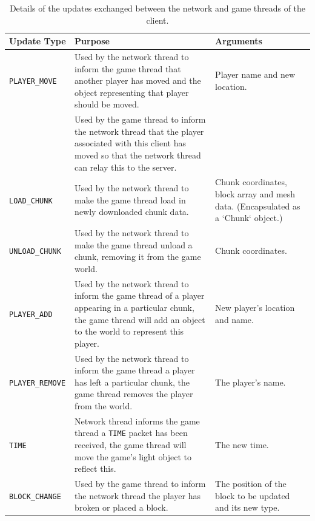 \documentclass[10pt,twoside,notitlepage,a4paper]{report}
\begin{document}
	\begin{table}
		\begin{tabularx}{\textwidth}{| l | X | p{3cm} |}
			\hline
			\bf Update Type & Purpose & Arguments \\
			\hline
			\tt PLAYER\_MOVE & Used by the network thread to inform the game thread that another player has moved and the object representing that player should be moved. & Player name and new location.\\
			\cline{2-2}
			\tt & Used by the game thread to inform the network thread that the player associated with this client has moved so that the network thread can relay this to the server. & \\
			\hline
			\tt LOAD\_CHUNK & Used by the network thread to make the game thread load in newly downloaded chunk data. & Chunk coordinates, block array and mesh data. (Encapsulated as a `Chunk` object.) \\
			\hline
			\tt UNLOAD\_CHUNK & Used by the network thread to make the game thread unload a chunk, removing it from the game world. & Chunk coordinates. \\
			\hline
			\tt PLAYER\_ADD & Used by the network thread to inform the game thread of a player appearing in a particular chunk, the game thread will add an object to the world to represent this player. & New player's location and name. \\
			\hline
			\tt PLAYER\_REMOVE & Used by the network thread to inform the game thread a player has left a particular chunk, the game thread removes the player from the world. & The player's name. \\
			\hline
			\tt TIME & Network thread informs the game thread a \texttt{TIME} packet has been received, the game thread will move the game's light object to reflect this. & The new time. \\
			\hline
			\tt BLOCK\_CHANGE & Used by the game thread to inform the network thread the player has broken or placed a block. & The position of the block to be updated and its new type.\\
			\hline
		\end{tabularx}
		\caption{Details of the updates exchanged between the network and game threads of the client.}
		\label{tab:updates}
	\end{table}
	
\end{document}
